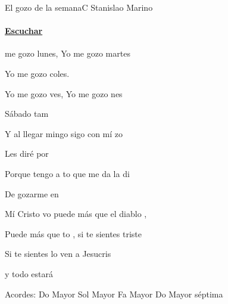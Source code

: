 \documentclass[12pt, spanish]{book}
\begin{document}
    \begin{song}{El gozo de la semana}{C}
        {} %
        {Stanislao Marino}
        {} %
        {}
        \ifChordBk
        \paragraph{\mbox{}\hfill\protect\href{https://open.spotify.com/intl-es/track/5cN3v9Vuyr8jlo2ZNxHcmQ}{Escuchar}\mbox{}\hfill}
        \fi


        \begin{SBOpGroup}
             me gozo lunes,  Yo me gozo martes

            Yo me gozo coles.

            Yo me gozo ves, Yo me gozo nes

            Sábado tam

            Y al llegar mingo sigo con mí zo

            Les diré por

            Porque tengo a to que me da la di

            De gozarme en 
        \end{SBOpGroup}

        \begin{SBChorus}
            Mí Cristo vo puede más que el diablo ,

            Puede más que to , si te sientes triste

            Si te sientes lo ven a Jesucris

            y todo estará 
        \end{SBChorus}

        \ifChordBk
        \begin{SBOpGroup}
            Acordes:
            \upchord{\C}\qquad Do Mayor \hfill
            \upchord{\G}\qquad Sol Mayor \hfill\null\break
            \upchord{\F}\qquad Fa Mayor \hfill
            \upchord{\Cseven}\qquad Do Mayor s\'eptima \hfill\null\break
        \end{SBOpGroup}
        \fi
    \end{song}
\end{document}

